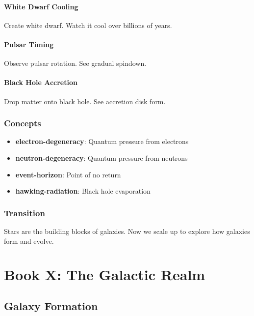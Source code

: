 \documentclass[
  11pt,
  letterpaper,
  twoside,
  openright]{book}
\providecommand{\tightlist}{%
  \setlength{\itemsep}{0pt}\setlength{\parskip}{0pt}}
\begin{document}
\subsection{White Dwarf Cooling}\label{white-dwarf-cooling}

Create white dwarf. Watch it cool over billions of years.

\subsection{Pulsar Timing}\label{pulsar-timing}

Observe pulsar rotation. See gradual spindown.

\subsection{Black Hole Accretion}\label{black-hole-accretion}

Drop matter onto black hole. See accretion disk form.

\section{Concepts}\label{concepts-23}

\begin{itemize}
\tightlist
\item
  \textbf{electron-degeneracy}: Quantum pressure from electrons
\item
  \textbf{neutron-degeneracy}: Quantum pressure from neutrons
\item
  \textbf{event-horizon}: Point of no return
\item
  \textbf{hawking-radiation}: Black hole evaporation
\end{itemize}

\section{Transition}\label{transition-23}

Stars are the building blocks of galaxies. Now we scale up to explore
how galaxies form and evolve.

\part{Book X: The Galactic Realm}

\chapter{Galaxy Formation}\label{sec-galaxy-formation}
\end{document}
